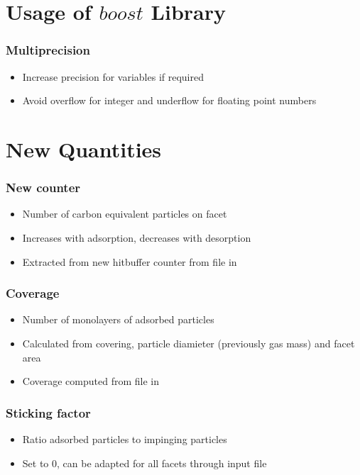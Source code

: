 \section{Usage of $boost$ Library}
\subsubsection{Multiprecision}
\begin{itemize}[noitemsep,topsep=0pt, partopsep=0pt]
\item Increase precision for variables if required
\item Avoid overflow for integer and underflow for floating point numbers
\end{itemize}
\section{New Quantities}
\label{sub:quant}
\subsubsection{New counter }
\begin{itemize}[noitemsep,topsep=0pt, partopsep=0pt]
\item Number of carbon equivalent particles on facet
\item Increases with adsorption, decreases with desorption
\item Extracted from new hitbuffer counter from  file in 
\end{itemize}

\subsubsection{Coverage}
\begin{itemize}[noitemsep,topsep=0pt, partopsep=0pt]
\item Number of monolayers of adsorbed particles
\item Calculated from covering, particle diamieter (previously gas mass) and facet area
\item Coverage computed from  file in 
\end{itemize}

\subsubsection{Sticking factor}
\begin{itemize}[noitemsep,topsep=0pt, partopsep=0pt]
\item Ratio adsorbed particles to impinging particles
\item Set to 0, can be adapted for all facets through input file
\end{itemize}

